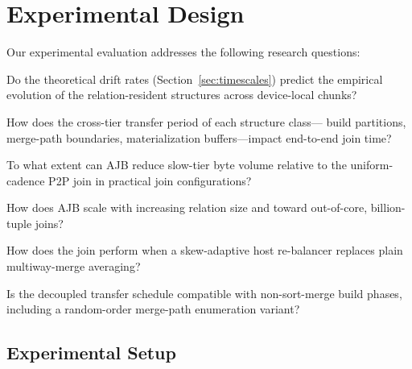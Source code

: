 \documentclass{article}
\begin{document}
\section{Experimental Design}
\label{sec:experimental_design}

Our experimental evaluation addresses the following research questions:
\begin{description}[nosep,leftmargin=*]
\item[RQ1] Do the theoretical drift rates (Section~\ref{sec:timescales})
  predict the empirical evolution of the relation-resident structures across
  device-local chunks?
\item[RQ2] How does the cross-tier transfer period of each structure class---
  build partitions, merge-path boundaries, materialization buffers---impact
  end-to-end join time?
\item[RQ3] To what extent can AJB reduce slow-tier byte volume relative to the
  uniform-cadence P2P join in practical join configurations?
\item[RQ4] How does AJB scale with increasing relation size and toward
  out-of-core, billion-tuple joins?
\item[RQ5] How does the join perform when a skew-adaptive host re-balancer
  replaces plain multiway-merge averaging?
\item[RQ6] Is the decoupled transfer schedule compatible with non-sort-merge
  build phases, including a random-order merge-path enumeration variant?
\end{description}

\subsection{Experimental Setup}
\label{sec:experimental_setup}
\end{document}
